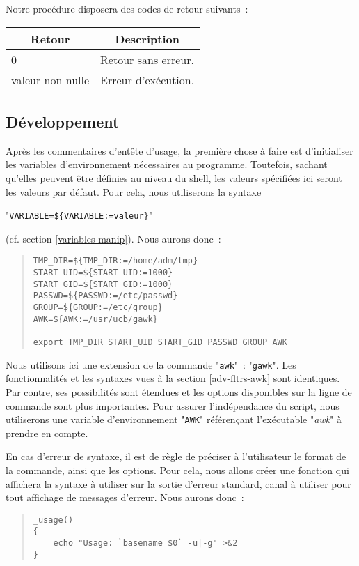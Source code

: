 Notre proc{\'e}dure disposera des codes de retour suivants~:
\begin{center}
\begin{tabular}{|l|p{3cm}|}
	\hline
		\multicolumn{1}{|c|}{Retour}		&
		\multicolumn{1}{|c|}{Description}	\\
	\hline \hline
		0					&	Retour sans erreur.	\\
		valeur non nulle	&	Erreur d'ex{\'e}cution.	\\
	\hline
\end{tabular}
\end{center}

\subsection{D{\'e}veloppement}

Apr{\`e}s les commentaires d'ent{\^e}te d'usage, la premi{\`e}re chose
{\`a} faire est d'initia\-liser les variables d'environnement
n{\'e}cessaires au programme. Toutefois, sachant qu'elles peuvent
{\^e}tre d{\'e}finies au niveau du shell, les valeurs sp{\'e}cifi{\'e}es
ici seront les valeurs par d{\'e}faut. Pour cela, nous utiliserons la
syntaxe 
\begin{center}
"\verb,VARIABLE=${VARIABLE:=valeur},"
\end{center}
 (cf. section \ref{variables-manip}). Nous aurons donc~:
\begin{quote}
\begin{verbatim}
TMP_DIR=${TMP_DIR:=/home/adm/tmp}
START_UID=${START_UID:=1000}
START_GID=${START_GID:=1000}
PASSWD=${PASSWD:=/etc/passwd}
GROUP=${GROUP:=/etc/group}
AWK=${AWK:=/usr/ucb/gawk}

export TMP_DIR START_UID START_GID PASSWD GROUP AWK
\end{verbatim}
\end{quote}

\begin{remarque}
Nous utilisons ici une extension de la commande "{\tt awk}"~: "{\tt gawk}".
Les fonctionnalit{\'e}s et les syntaxes vues {\`a} la section \ref{adv-fltrs-awk} sont
identiques. Par contre, ses possibilit{\'e}s sont {\'e}tendues et les options disponibles
sur la ligne de commande sont plus importantes. Pour assurer l'ind{\'e}pendance du
script, nous utiliserons une variable d'environnement "{\tt AWK}" r{\'e}f{\'e}ren\c{c}ant
l'ex{\'e}cutable "{\sl awk}" {\`a} prendre en compte.
\end{remarque}

En cas d'erreur de syntaxe, il est de r{\`e}gle de pr{\'e}ciser {\`a} l'utilisateur
le format de la commande, ainsi que les options. Pour cela, nous allons cr{\'e}er
une fonction qui affichera la syntaxe {\`a} utiliser sur la sortie d'erreur standard,
canal {\`a} utiliser pour tout affichage de messages d'erreur. Nous aurons donc~:
\begin{quote}
\begin{verbatim}
_usage()
{
    echo "Usage: `basename $0` -u|-g" >&2
}
\end{verbatim}
\end{quote}


